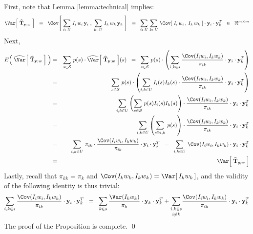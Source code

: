 \proof
First, note that Lemma \ref{lemma:technical} implies:
\begin{equation*}
\Var\!\left[\;\widehat{\mathbf{T}}_{\mathbf{y};w}\;\right]
\;\;=\;\; \Cov\!\left[\;\sum_{i\in U}\,I_{i}\,w_{i}\,\mathbf{y}_{i}\;,\;\sum_{k\in U}\,I_{k}\,w_{k}\,\mathbf{y}_{k}\;\right]
\;\;=\;\; \sum_{i\in U}\,\sum_{k\in U}\,\Cov\!\left[\;I_{i}\,w_{i}\,,\,I_{k}\,w_{k}\;\right]\cdot\mathbf{y}_{i}\cdot\mathbf{y}_{k}^{T}
\;\;\in\;\;\Re^{m \times m}
\end{equation*}
Next,
\begin{eqnarray*}
E\!\left(\;\widehat{\Var}\!\left[\;\widehat{\mathbf{T}}_{\mathbf{y};w}\;\right]\;\right)
&=& \sum_{s\in\mathcal{S}}\,p(s)\cdot\widehat{\Var}\!\left[\;\widehat{\mathbf{T}}_{\mathbf{y};w}\;\right]\!(s)
\;\;=\;\; \sum_{s\in\mathcal{S}}\,p(s)\cdot\left(\sum_{i,k \in s}\dfrac{\Cov(I_{i}w_{i},I_{k}w_{k})}{\pi_{ik}}\cdot\mathbf{y}_{i}\cdot\mathbf{y}_{k}^{T}\right) \\
&=& \sum_{s\in\mathcal{S}}\,p(s)\cdot
\left(\sum_{i,k \in U}I_{i}(s)I_{k}(s)\cdot\dfrac{\Cov(I_{i}w_{i},I_{k}w_{k})}{\pi_{ik}}\cdot\mathbf{y}_{i}\cdot\mathbf{y}_{k}^{T}\right) \\
&=& \sum_{i,k \in U}\left(\sum_{s\in\mathcal{S}}\,p(s)I_{i}(s)I_{k}(s)\right)\cdot\dfrac{\Cov(I_{i}w_{i},I_{k}w_{k})}{\pi_{ik}}\cdot\mathbf{y}_{i}\cdot\mathbf{y}_{k}^{T} \\
&=& \sum_{i,k \in U}\left(\sum_{s\ni i, k}\,p(s)\right)\cdot\dfrac{\Cov(I_{i}w_{i},I_{k}w_{k})}{\pi_{ik}}\cdot\mathbf{y}_{i}\cdot\mathbf{y}_{k}^{T} \\
&=& \sum_{i,k \in U}\,\pi_{ik}\cdot\dfrac{\Cov(I_{i}w_{i},I_{k}w_{k})}{\pi_{ik}}\cdot\mathbf{y}_{i}\cdot\mathbf{y}_{k}^{T}
\;\;=\;\; \sum_{i,k \in U}\,\Cov(I_{i}w_{i},I_{k}w_{k})\cdot\mathbf{y}_{i}\cdot\mathbf{y}_{k}^{T} \\
&=& \Var\!\left[\;\widehat{\mathbf{T}}_{y;w}\;\right]
\end{eqnarray*}
Lastly, recall that $\pi_{kk} = \pi_{k}$ and $\Cov(I_{k}w_{k},I_{k}w_{k}) = \Var[\,I_{k}w_{k}\,]$,
and the validity of the following identity is thus trivial:
\begin{equation*}
\sum_{i,k \in s}\dfrac{\Cov(I_{i}w_{i},I_{k}w_{k})}{\pi_{ik}}\cdot\mathbf{y}_{i}\cdot\mathbf{y}_{k}^{T}
\;\;=\;\; \sum_{k \in s}\dfrac{\Var(I_{k}w_{k})}{\pi_{k}}\cdot\mathbf{y}_{k}\cdot\mathbf{y}_{k}^{T}
       + \underset{i \neq k}{\sum_{i,k \in s}}\dfrac{\Cov(I_{i}w_{i},I_{k}w_{k})}{\pi_{ik}}\cdot\mathbf{y}_{i}\cdot\mathbf{y}_{k}^{T}
\end{equation*}
The proof of the Proposition is complete.
\qed

